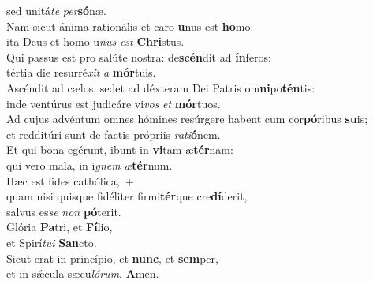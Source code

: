 \evenverse sed unitá\textit{te} \textit{per}\textbf{só}næ.\\
\oddverse Nam sicut ánima rationális et caro \textbf{u}nus est \textbf{ho}mo:~\*\\
\oddverse ita Deus et homo u\textit{nus} \textit{est} \textbf{Chri}stus.\\
\evenverse Qui passus est pro salúte nostra: de\textbf{scén}dit ad \textbf{ín}feros:~\*\\
\evenverse tértia die resurré\textit{xit} \textit{a} \textbf{mór}tuis.\\
\oddverse Ascéndit ad cælos, sedet ad déxteram Dei Patris om\textbf{ni}po\textbf{tén}tis:~\*\\
\oddverse inde ventúrus est judicáre vi\textit{vos} \textit{et} \textbf{mór}tuos.\\
\evenverse Ad cujus advéntum omnes hómines resúrgere habent cum cor\textbf{pó}ribus \textbf{su}is;~\*\\
\evenverse et redditúri sunt de factis própriis \textit{ra}\textit{ti}\textbf{ó}nem.\\
\oddverse Et qui bona egérunt, ibunt in \textbf{vi}tam æ\textbf{tér}nam:~\*\\
\oddverse qui vero mala, in i\textit{gnem} \textit{æ}\textbf{tér}num.\\
\evenverse Hæc est fides cathólica,~+\\
\evenverse  quam nisi quisque fidéliter firmi\textbf{tér}que cre\textbf{dí}derit,~\*\\
\evenverse salvus es\textit{se} \textit{non} \textbf{pó}terit.\\
\oddverse Glória \textbf{Pa}tri, et \textbf{Fí}lio,~\*\\
\oddverse et Spirí\textit{tu}\textit{i} \textbf{San}cto.\\
\evenverse Sicut erat in princípio, et \textbf{nunc}, et \textbf{sem}per,~\*\\
\evenverse et in sǽcula sæcu\textit{ló}\textit{rum}. \textbf{A}men.\\
